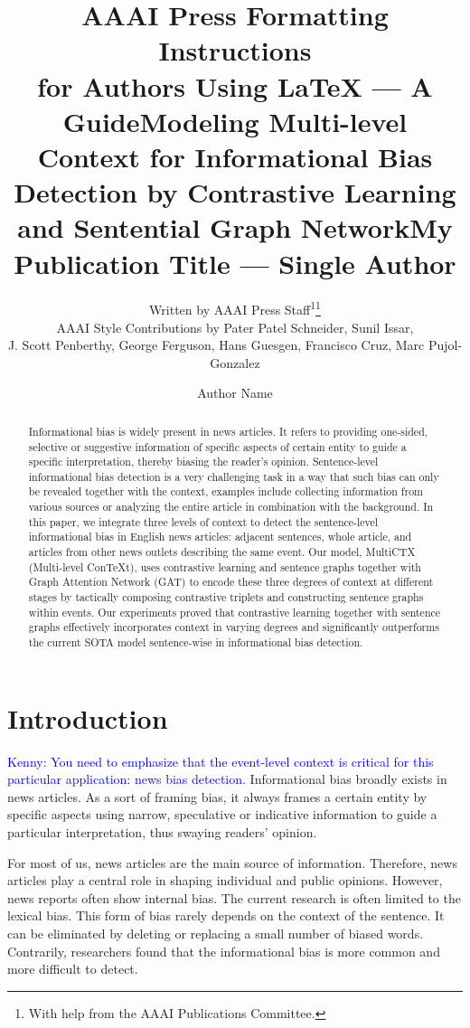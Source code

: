 \documentclass[letterpaper]{article} %
\title{AAAI Press Formatting Instructions \\for Authors Using \LaTeX{} --- A Guide}
\author{
    Written by AAAI Press Staff\textsuperscript{\rm 1}\thanks{With help from the AAAI Publications Committee.}\\
    AAAI Style Contributions by Pater Patel Schneider,
    Sunil Issar,\\
    J. Scott Penberthy,
    George Ferguson,
    Hans Guesgen,
    Francisco Cruz\equalcontrib,
    Marc Pujol-Gonzalez\equalcontrib
}
\title{Modeling Multi-level Context for Informational Bias Detection by 
Contrastive Learning and Sentential Graph Network}
\title{My Publication Title --- Single Author}
\author {
    Author Name
}
\newcommand{\KZ}[1]{\textcolor{blue}{Kenny: #1}}
\begin{document}
\maketitle

\begin{abstract}
Informational bias is widely present in news articles. 
It refers to providing one-sided, selective or suggestive information of specific aspects of certain entity to guide a specific interpretation, thereby biasing the reader's opinion. Sentence-level informational bias detection is a very challenging task in a way that such bias can only be revealed together with the context, examples include collecting information from various sources or analyzing the entire article in combination with the background. In this paper, we integrate three levels of context to detect the sentence-level informational bias in English news articles: adjacent sentences, whole article, and articles from other news outlets describing the same event. Our model, MultiCTX (Multi-level ConTeXt), uses contrastive learning and sentence graphs together with Graph Attention Network (GAT) to encode these three degrees of context at different stages by tactically composing contrastive triplets and constructing sentence graphs within events. Our experiments proved that contrastive learning together with sentence graphs effectively incorporates context in varying degrees and significantly outperforms the current SOTA model sentence-wise in informational bias detection.

\end{abstract}





\section{Introduction}


\KZ{You need to emphasize that the event-level context is critical for this
particular application: news bias detection.}
Informational bias broadly exists in news articles. As a sort of framing bias, it always frames a certain entity by specific aspects using narrow, speculative or indicative information  to guide a particular interpretation, thus swaying readers' opinion. 

For most of us, news articles are the main source of information. Therefore, news articles play a central role in shaping individual and public opinions. However, news reports often show internal bias. The current research is often limited to the lexical bias. This form of bias rarely depends on the context of the sentence. It can be eliminated by deleting or replacing a small number of biased words. Contrarily, researchers \citet{fan-etal-2019-plain} found that the informational bias is more common and more difficult to detect.
\end{document}
